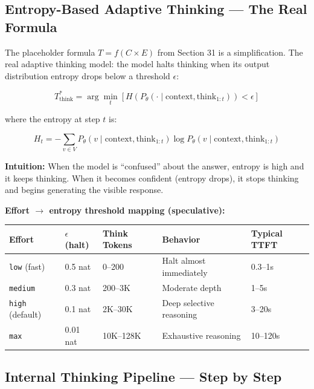 \documentclass[11pt,a4paper]{article}
\begin{document}
\subsection{Entropy-Based Adaptive Thinking --- The Real Formula}

The placeholder formula $T = f(C \times E)$ from Section 31 is a simplification. The real adaptive thinking model: the model halts thinking when its output distribution entropy drops below a threshold $\epsilon$:

$$T_{\text{think}}^* = \arg\min_{t} \left[ H(P_\theta(\cdot \mid \text{context}, \text{think}_{1:t})) < \epsilon \right]$$

where the entropy at step $t$ is:

$$H_t = -\sum_{v \in V} P_\theta(v \mid \text{context}, \text{think}_{1:t}) \log P_\theta(v \mid \text{context}, \text{think}_{1:t})$$

\textbf{Intuition:} When the model is ``confused'' about the answer, entropy is high and it keeps thinking. When it becomes confident (entropy drops), it stops thinking and begins generating the visible response.

\textbf{Effort $\to$ entropy threshold mapping (speculative):}

\begin{center}
\begin{tabular}{lllll}
\toprule
\textbf{Effort} & \textbf{$\epsilon$ (halt)} & \textbf{Think Tokens} & \textbf{Behavior} & \textbf{Typical TTFT} \\
\midrule
\texttt{low} (fast) & 0.5 nat & 0--200 & Halt almost immediately & 0.3--1s \\
\texttt{medium} & 0.3 nat & 200--3K & Moderate depth & 1--5s \\
\texttt{high} (default) & 0.1 nat & 2K--30K & Deep selective reasoning & 3--20s \\
\texttt{max} & 0.01 nat & 10K--128K & Exhaustive reasoning & 10--120s \\
\bottomrule
\end{tabular}
\end{center}

\subsection{Internal Thinking Pipeline --- Step by Step}
\end{document}

